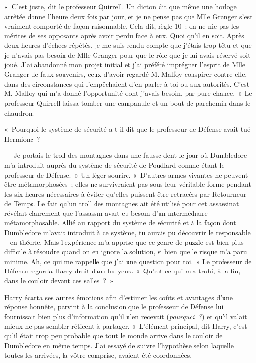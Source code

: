 «~C'est juste, dit le professeur Quirrell. Un dicton dit que même une horloge arrêtée donne l'heure deux fois par jour, et je ne pense pas que Mlle Granger s'est vraiment comporté de façon raisonnable. Cela dit, règle 10~: on ne nie pas les mérites de ses opposants après avoir perdu face à eux. Quoi qu'il en soit. Après deux heures d'échecs répétés, je me suis rendu compte que j'étais trop têtu et que je n'avais pas besoin de Mlle Granger pour que le rôle que je lui avais réservé soit joué. J'ai abandonné mon projet initial et j'ai préféré imprégner l'esprit de Mlle Granger de faux souvenirs, ceux d'avoir regardé M. Malfoy conspirer contre elle, dans des circonstances qui l'empêchaient d'en parler à toi ou aux autorités. C'est M. Malfoy qui m'a donné l'opportunité dont j'avais besoin, par pure chance.~» Le professeur Quirrell laissa tomber une campanule et un bout de parchemin dans le chaudron.

«~Pourquoi le système de sécurité a-t-il dit que le professeur de Défense avait tué Hermione~?

--- Je portais le troll des montagnes dans une fausse dent le jour où Dumbledore m'a introduit auprès du système de sécurité de Poudlard comme étant le professeur de Défense.~» Un léger sourire. «~D'autres armes vivantes ne peuvent être métamorphosées~; elles ne survivraient pas sous leur véritable forme pendant les six heures nécessaires à éviter qu'elles puissent être retracées par Retourneur de Temps. Le fait qu'un troll des montagnes ait été utilisé pour cet assassinat révélait clairement que l'assassin avait eu besoin d'un intermédiaire métamorphosable. Allié au rapport du système de sécurité et à la façon dont Dumbledore m'avait introduit à ce système, tu aurais pu découvrir le responsable -- en théorie. Mais l'expérience m'a apprise que ce genre de puzzle est bien plus difficile à résoudre quand on en ignore la solution, si bien que le risque m'a paru minime. Ah, ce qui me rappelle que j'ai une question pour toi.~» Le professeur de Défense regarda Harry droit dans les yeux. «~Qu'est-ce qui m'a trahi, à la fin, dans le couloir devant ces salles~?~»

Harry écarta ses autres émotions afin d'estimer les coûts et avantages d'une réponse honnête, parvint à la conclusion que le professeur de Défense lui fournissait bien plus d'information qu'il n'en recevait (\emph{pourquoi~?}) et qu'il valait mieux ne pas sembler réticent à partager. «~L'élément principal, dit Harry, c'est qu'il était trop peu probable que tout le monde arrive dans le couloir de Dumbledore en même temps. J'ai essayé de suivre l'hypothèse selon laquelle toutes les arrivées, la vôtre comprise, avaient été coordonnées.

